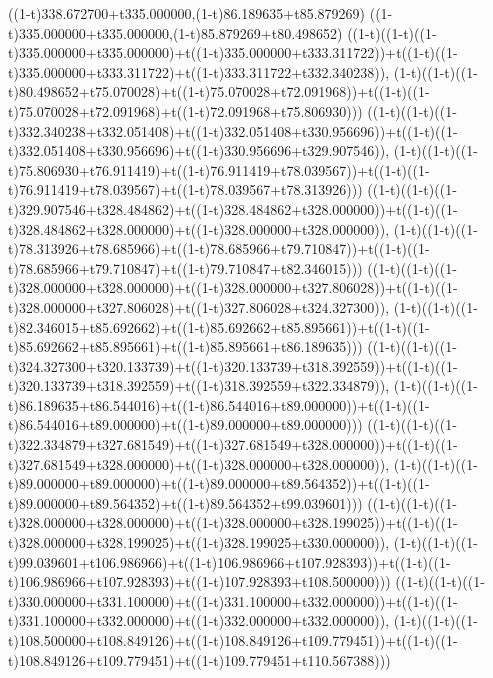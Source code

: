 ((1-t)338.672700+t335.000000,(1-t)86.189635+t85.879269)
((1-t)335.000000+t335.000000,(1-t)85.879269+t80.498652)
((1-t)((1-t)((1-t)335.000000+t335.000000)+t((1-t)335.000000+t333.311722))+t((1-t)((1-t)335.000000+t333.311722)+t((1-t)333.311722+t332.340238)),                                     (1-t)((1-t)((1-t)80.498652+t75.070028)+t((1-t)75.070028+t72.091968))+t((1-t)((1-t)75.070028+t72.091968)+t((1-t)72.091968+t75.806930)))
((1-t)((1-t)((1-t)332.340238+t332.051408)+t((1-t)332.051408+t330.956696))+t((1-t)((1-t)332.051408+t330.956696)+t((1-t)330.956696+t329.907546)),                                     (1-t)((1-t)((1-t)75.806930+t76.911419)+t((1-t)76.911419+t78.039567))+t((1-t)((1-t)76.911419+t78.039567)+t((1-t)78.039567+t78.313926)))
((1-t)((1-t)((1-t)329.907546+t328.484862)+t((1-t)328.484862+t328.000000))+t((1-t)((1-t)328.484862+t328.000000)+t((1-t)328.000000+t328.000000)),                                     (1-t)((1-t)((1-t)78.313926+t78.685966)+t((1-t)78.685966+t79.710847))+t((1-t)((1-t)78.685966+t79.710847)+t((1-t)79.710847+t82.346015)))
((1-t)((1-t)((1-t)328.000000+t328.000000)+t((1-t)328.000000+t327.806028))+t((1-t)((1-t)328.000000+t327.806028)+t((1-t)327.806028+t324.327300)),                                     (1-t)((1-t)((1-t)82.346015+t85.692662)+t((1-t)85.692662+t85.895661))+t((1-t)((1-t)85.692662+t85.895661)+t((1-t)85.895661+t86.189635)))
((1-t)((1-t)((1-t)324.327300+t320.133739)+t((1-t)320.133739+t318.392559))+t((1-t)((1-t)320.133739+t318.392559)+t((1-t)318.392559+t322.334879)),                                     (1-t)((1-t)((1-t)86.189635+t86.544016)+t((1-t)86.544016+t89.000000))+t((1-t)((1-t)86.544016+t89.000000)+t((1-t)89.000000+t89.000000)))
((1-t)((1-t)((1-t)322.334879+t327.681549)+t((1-t)327.681549+t328.000000))+t((1-t)((1-t)327.681549+t328.000000)+t((1-t)328.000000+t328.000000)),                                     (1-t)((1-t)((1-t)89.000000+t89.000000)+t((1-t)89.000000+t89.564352))+t((1-t)((1-t)89.000000+t89.564352)+t((1-t)89.564352+t99.039601)))
((1-t)((1-t)((1-t)328.000000+t328.000000)+t((1-t)328.000000+t328.199025))+t((1-t)((1-t)328.000000+t328.199025)+t((1-t)328.199025+t330.000000)),                                     (1-t)((1-t)((1-t)99.039601+t106.986966)+t((1-t)106.986966+t107.928393))+t((1-t)((1-t)106.986966+t107.928393)+t((1-t)107.928393+t108.500000)))
((1-t)((1-t)((1-t)330.000000+t331.100000)+t((1-t)331.100000+t332.000000))+t((1-t)((1-t)331.100000+t332.000000)+t((1-t)332.000000+t332.000000)),                                     (1-t)((1-t)((1-t)108.500000+t108.849126)+t((1-t)108.849126+t109.779451))+t((1-t)((1-t)108.849126+t109.779451)+t((1-t)109.779451+t110.567388)))
